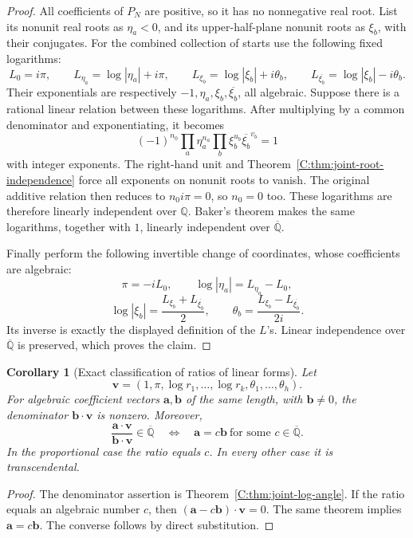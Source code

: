 \documentclass[11pt,a4paper]{article}
\newtheorem{corollary}[theorem]{Corollary}
\theoremstyle{definition}
\theoremstyle{remark}
\numberwithin{equation}{section}
\begin{document}
\begin{proof}
All coefficients of $P_N$ are positive, so it has no nonnegative
real root.  List its nonunit real roots as $\eta_a<0$, and its
upper-half-plane nonunit roots as $\xi_b$, with their conjugates.
For the combined collection of starts use the following fixed
logarithms:
\[
 L_0=i\pi,\qquad
 L_{\eta_a}=\log|\eta_a|+i\pi,\qquad
 L_{\xi_b}=\log|\xi_b|+i\theta_b,\qquad
 L_{\overline{\xi_b}}=\log|\xi_b|-i\theta_b.
\]
Their exponentials are respectively $-1,\eta_a,\xi_b,\overline{\xi_b}$,
all algebraic.
Suppose there is a rational linear relation between these logarithms.
After multiplying by a common denominator and exponentiating, it
becomes
\[
 (-1)^{n_0}\prod_a\eta_a^{n_a}
       \prod_b\xi_b^{u_b}\overline{\xi_b}^{v_b}=1
\]
with integer exponents.
The right-hand unit and Theorem~\ref{C:thm:joint-root-independence}
force all exponents on nonunit roots to vanish.
The original additive relation then reduces to $n_0i\pi=0$,
so $n_0=0$ too.
These logarithms are therefore linearly independent over $\mathbb Q$.
Baker's theorem makes the same logarithms, together with $1$,
linearly independent over $\overline{\mathbb Q}$.

Finally perform the following invertible change of coordinates,
whose coefficients are algebraic:
\[
 \pi=-iL_0,\qquad
 \log|\eta_a|=L_{\eta_a}-L_0,
\]
\[
 \log|\xi_b|
   =\frac{L_{\xi_b}+L_{\overline{\xi_b}}}{2},
 \qquad
 \theta_b
   =\frac{L_{\xi_b}-L_{\overline{\xi_b}}}{2i}.
\]
Its inverse is exactly the displayed definition of the $L$'s.
Linear independence over $\overline{\mathbb Q}$ is preserved,
which proves the claim.
\end{proof}

\begin{corollary}[Exact classification of ratios of linear forms]
\label{C:cor:joint-form-ratios}
Let
\[
 \mathbf v=(1,\pi,\log r_1,\ldots,\log r_k,
                    \theta_1,\ldots,\theta_h).
\]
For algebraic coefficient vectors $\mathbf a,\mathbf b$ of the
same length, with $\mathbf b\ne0$, the denominator
$\mathbf b\cdot\mathbf v$ is nonzero.  Moreover,
\[
 \frac{\mathbf a\cdot\mathbf v}{\mathbf b\cdot\mathbf v}
 \in\overline{\mathbb Q}
 \quad\Longleftrightarrow\quad
 \mathbf a=c\mathbf b
 \ \text{for some }c\in\overline{\mathbb Q}.
\]
In the proportional case the ratio equals $c$.
In every other case it is transcendental.
\end{corollary}

\begin{proof}
The denominator assertion is
Theorem~\ref{C:thm:joint-log-angle}.
If the ratio equals an algebraic number $c$, then
$(\mathbf a-c\mathbf b)\cdot\mathbf v=0$.
The same theorem implies $\mathbf a=c\mathbf b$.
The converse follows by direct substitution.
\end{proof}
\end{document}
